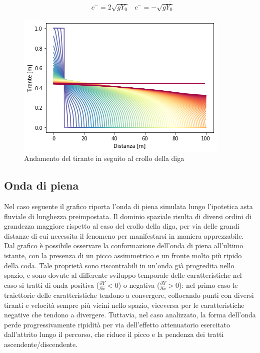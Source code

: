 \documentclass[12pt]{article} %
\begin{document}
\begin{align*}
    &c^-=2\sqrt{gY_0}
    &c^-=-\sqrt{gY_0}
\end{align*}


\begin{figure} [H]
    \centering
    \includegraphics[scale=0.95]{Diga.png}
    \caption{Andamento del tirante in seguito al crollo della diga}
    \label{fig:diga}
\end{figure}

\subsection{Onda di piena}

\noindent Nel caso seguente il grafico riporta l'onda di piena simulata lungo l'ipotetica asta fluviale di lunghezza preimpostata. Il dominio spaziale risulta di diversi ordini di grandezza maggiore rispetto al caso del crollo della diga, per via delle grandi distanze di cui necessita il fenomeno per manifestarsi in maniera apprezzabile.\\
Dal grafico è possibile osservare la conformazione dell'onda di piena all'ultimo istante, con la presenza di un picco assimmetrico e un fronte molto più ripido della coda. Tale proprietà sono riscontrabili in un'onda già progredita nello spazio, e sono dovute al differente sviluppo temporale delle caratteristiche nel caso si tratti di onda positiva ($\frac{\partial Y}{\partial x}<0$) o negativa ($\frac{\partial Y}{\partial x}>0$): nel primo caso le traiettorie delle caratteristiche tendono a convergere, collocando punti con diversi tiranti e velocità sempre più vicini nello spazio, viceversa per le caratteristiche negative che tendono a divergere. Tuttavia, nel caso analizzato, la forma dell'onda perde progressivamente ripidità per via dell'effetto attenuatorio esercitato dall'attrito lungo il percorso, che riduce il picco e la pendenza dei tratti ascendente/discendente.
\end{document}
